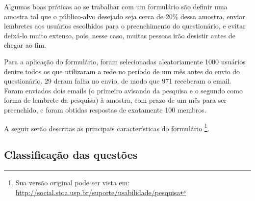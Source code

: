 	Algumas boas práticas ao se trabalhar com um formulário são definir uma amostra tal que o público-alvo desejado seja cerca de 20\% dessa amostra, enviar lembretes aos usuários escolhidos para o preenchimento do questionário, e evitar deixá-lo muito extenso, pois, nesse caso, muitas pessoas irão desistir antes de chegar ao fim.
	

    Para a aplicação do formulário, foram selecionadas aleatoriamente 1000 usuários dentre todos os que utilizaram a rede no período de um mês antes do envio do questionário. 29 deram falha no envio, de modo que 971 receberam o email. Foram enviados dois emails (o primeiro avisando da pesquisa e o segundo como forma de lembrete da pesquisa) à amostra, com prazo de um mês para ser preenchido, e foram obtidas respostas de exatamente 100 membros.

	
	A seguir serão descritas as principais características do formulário \footnote{Sua versão original pode ser vista em: \url{http://social.stoa.usp.br/suporte/usabilidade/pesquisa}}.
	

\subsection{Classificação das questões}
\label{sec:classificacao}
	
